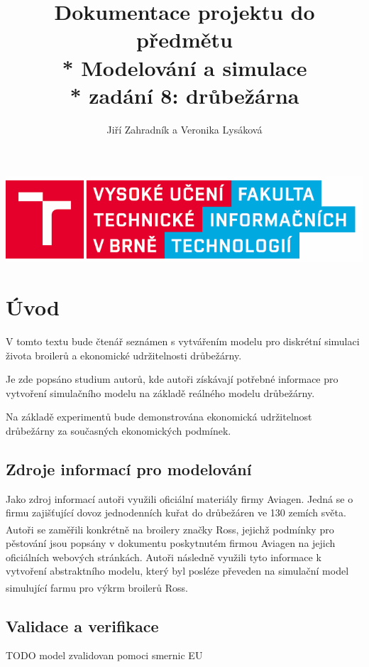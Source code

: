 \documentclass[a4paper,10pt]{article}
\title{Dokumentace projektu do předmětu \\* Modelování a simulace\\* zadání 8: drůbežárna}
\author{Jiří Zahradník a Veronika Lysáková}
\date{}
\begin{document}
\maketitle
\includegraphics[scale=0.5]{fitnewb.png}
\pagebreak

\renewcommand{\contentsname}{Obsah}
\tableofcontents

\renewcommand{\figurename}{Obrázek}


\pagebreak

%
%

\section{Úvod}
V tomto textu bude čtenář seznámen s vytvářením modelu pro diskrétní simulaci 
života broilerů a ekonomické udržitelnosti drůbežárny.
\par 
Je zde popsáno studium autorů, kde autoři získávají potřebné informace
pro vytvoření simulačního modelu na základě reálného modelu drůbežárny.
\par
Na základě experimentů bude demonstrována ekonomická udržitelnost
drůbežárny za současných ekonomických podmínek.

\subsection{Zdroje informací pro modelování\cite{modelovani}}\label{zdroje}
Jako zdroj informací autoři využili oficiální materiály firmy Aviagen\cite{aviagen}.
Jedná se o firmu zajišťující dovoz jednodenních kuřat do drůbežáren ve 130 zemích světa.
Autoři se zaměřili konkrétně na broilery značky Ross\textsuperscript{\textregistered},
jejichž podmínky pro pěstování jsou popsány v dokumentu poskytnutém firmou Aviagen\cite{ross}
na jejich oficiálních webových stránkách. Autoři následně využili tyto informace k
vytvoření abstraktního modelu\cite{abstract_model}, který byl posléze převeden na simulační model\cite{simulation_model}
simulující farmu pro výkrm broilerů Ross\textsuperscript{\textregistered}. 

\subsection{Validace a verifikace}\label{validaceVerifikace}
TODO model zvalidovan pomoci smernic EU
\end{document}
